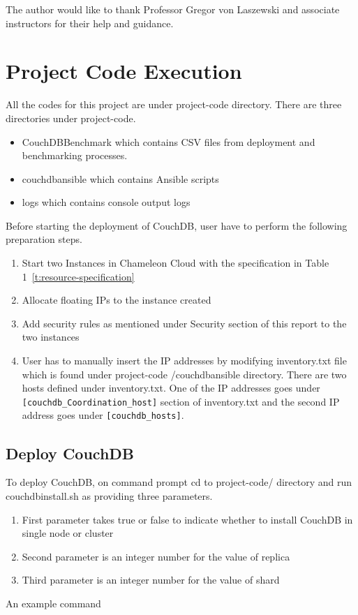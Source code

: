 The author would like to thank Professor Gregor von Laszewski and
associate instructors for their help and guidance.



 
\appendix
\section{Project Code Execution}
All the codes for this project are under project-code
directory. There are three directories under project-code.
\begin{itemize}
  \item CouchDBBenchmark which contains CSV files from deployment and
    benchmarking processes.  
  \item couchdbansible which contains Ansible scripts
  \item logs which contains console output logs
\end{itemize}

 Before starting the deployment of CouchDB, user have to
perform the following preparation steps.
\begin{enumerate}
  \item Start two Instances in Chameleon Cloud with the specification
    in Table 1~\ref{t:resource-specification}
   \item  Allocate floating IPs to the instance created
    \item Add  security rules as mentioned under Security section
      of this report to the two instances 
    \item  User has to manually insert the IP addresses by modifying
      inventory.txt file which is found under project-code
      /couchdbansible directory. There are two hosts 
      defined under inventory.txt. One of the IP addresses
      goes under \verb|[couchdb_Coordination_host]| section of inventory.txt
      and the second IP address goes under \verb|[couchdb_hosts]|.
\end{enumerate}

\subsection{Deploy CouchDB}
To deploy CouchDB, on command prompt cd to project-code/ directory and run
couchdbinstall.sh as providing three parameters. 
\begin{enumerate}
  \item First parameter takes true or false to indicate whether to
    install CouchDB in single node or cluster
    \item Second parameter is an integer number for the value of
      replica
      \item Third parameter is an integer number for the value of
      shard
\end{enumerate}
An example command


